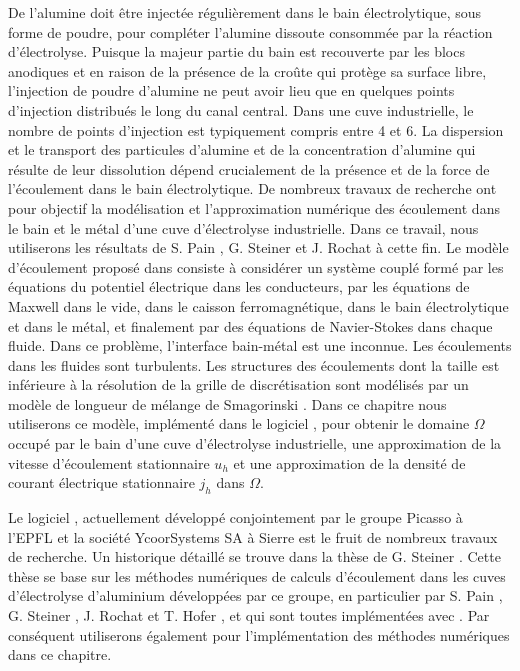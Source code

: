 De l'alumine doit être injectée régulièrement dans le bain
électrolytique, sous forme de poudre, pour compléter l'alumine
dissoute consommée par la réaction d'électrolyse. Puisque la majeur
partie du bain est recouverte par les blocs anodiques et en raison de
la présence de la croûte qui protège sa surface libre, l'injection de
poudre d'alumine ne peut avoir lieu que en quelques points d'injection
distribués le long du canal central. Dans une cuve industrielle, le
nombre de points d'injection est typiquement compris entre 4 et 6. La
dispersion et le transport des particules d'alumine et de la
concentration d'alumine qui résulte de leur dissolution dépend
crucialement de la présence et de la force de l'écoulement dans le
bain électrolytique. De nombreux travaux de recherche ont pour
objectif la modélisation et l'approximation numérique des écoulement
dans le bain et le métal d'une cuve d'électrolyse industrielle. Dans
ce travail, nous utiliserons les résultats de S. Pain \cite{Pain2006},
G. Steiner \cite{Steiner2009} et J. Rochat \cite{Rochat2016} à cette
fin. Le modèle d'écoulement proposé dans \cite{Steiner2009} consiste à
considérer un système couplé formé par les équations du potentiel
électrique dans les conducteurs, par les équations de Maxwell dans le
vide, dans le caisson ferromagnétique, dans le bain électrolytique et
dans le métal, et finalement par des équations de Navier-Stokes dans
chaque fluide. Dans ce problème, l'interface bain-métal est une
inconnue. Les écoulements dans les fluides sont turbulents. Les
structures des écoulements dont la taille est inférieure à la
résolution de la grille de discrétisation sont modélisés par un modèle
de longueur de mélange de Smagorinski \cite{Rochat2016}. Dans ce
chapitre nous utiliserons ce modèle, implémenté dans le logiciel
\citealucell, pour obtenir le domaine $\Omega$ occupé par le bain d'une
cuve d'électrolyse industrielle, une approximation de la vitesse
d'écoulement stationnaire $u_h$ et une approximation de la densité de
courant électrique stationnaire $j_h$ dans $\Omega$.

Le logiciel \alucell, actuellement développé conjointement par le
groupe Picasso à l'EPFL et la société YcoorSystems SA à Sierre est le
fruit de nombreux travaux de recherche. Un historique détaillé se
trouve dans la thèse de G. Steiner \cite{Steiner2009}. Cette thèse se
base sur les méthodes numériques de calculs d'écoulement dans les
cuves d'électrolyse d'aluminium développées par ce groupe, en
particulier par S. Pain \cite{Pain2006}, G. Steiner
\cite{Steiner2009}, J. Rochat \cite{Rochat2016} et T. Hofer
\cite{Hofer2011}, et qui sont toutes implémentées avec \alucell. Par
conséquent utiliserons également \alucell pour l'implémentation des
méthodes numériques dans ce chapitre.

